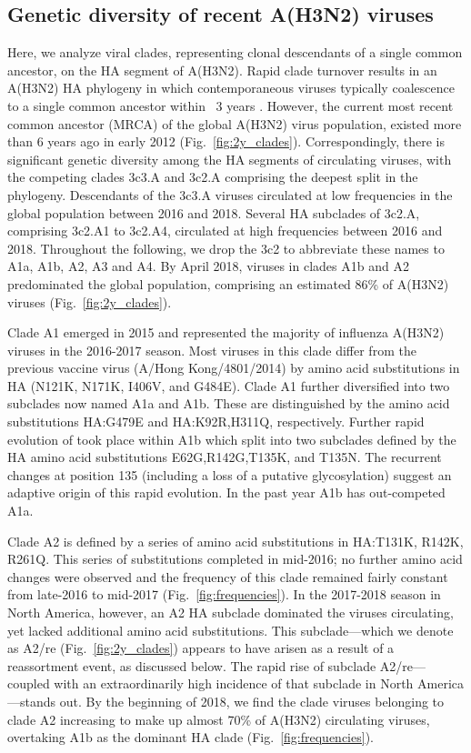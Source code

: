 \subsection*{Genetic diversity of recent A(H3N2) viruses}
Here, we analyze viral clades, representing clonal descendants of a single common ancestor, on the HA segment of A(H3N2).
Rapid clade turnover results in an A(H3N2) HA phylogeny in which contemporaneous viruses typically coalescence to a single common ancestor within ~3 years \citep{bedford_global_2015}.
However, the current most recent common ancestor (MRCA) of the global A(H3N2) virus population, existed more than 6 years ago in early 2012 (Fig.~\ref{fig:2y_clades}).
Correspondingly, there is significant genetic diversity among the HA segments of circulating viruses, with the competing clades 3c3.A and 3c2.A comprising the deepest split in the phylogeny.
Descendants of the 3c3.A viruses circulated at low frequencies in the global population between 2016 and 2018.
Several HA subclades of 3c2.A, comprising 3c2.A1 to 3c2.A4, circulated at high frequencies between 2016 and 2018.
Throughout the following, we drop the 3c2 to abbreviate these names to A1a, A1b, A2, A3 and A4.
By April 2018, viruses in clades A1b and A2 predominated the global population, comprising an estimated 86\% of A(H3N2) viruses (Fig.~\ref{fig:2y_clades}).

Clade A1 emerged in 2015 and represented the majority of influenza A(H3N2) viruses in the 2016-2017 season.
Most viruses in this clade differ from the previous vaccine virus (A/Hong Kong/4801/2014) by amino acid substitutions in HA (N121K, N171K, I406V, and G484E).
Clade A1 further diversified into two subclades now named A1a and A1b.
These are distinguished by the amino acid substitutions HA:G479E and HA:K92R,H311Q, respectively.
Further rapid evolution of took place within A1b which split into two subclades defined by the HA amino acid substitutions E62G,R142G,T135K, and T135N.
The recurrent changes at position 135 (including a loss of a putative glycosylation) suggest an adaptive origin of this rapid evolution.
In the past year A1b has out-competed A1a.

Clade A2 is defined by a series of amino acid substitutions in HA:T131K, R142K, R261Q.
This series of substitutions completed in mid-2016; no further amino acid changes were observed and the frequency of this clade remained fairly constant from late-2016 to mid-2017 (Fig.~\ref{fig:frequencies}).
In the 2017-2018 season in North America, however, an A2 HA subclade dominated the viruses circulating, yet lacked additional amino acid substitutions.
This subclade—which we denote as A2/re (Fig.~\ref{fig:2y_clades}) appears to have arisen as a result of a reassortment event, as discussed below.
The rapid rise of subclade A2/re---coupled with an extraordinarily high incidence of that subclade in North America---stands out.
By the beginning of 2018, we find the clade viruses belonging to clade A2 increasing to make up almost 70\% of A(H3N2) circulating viruses, overtaking A1b as the dominant HA clade (Fig.~\ref{fig:frequencies}).

